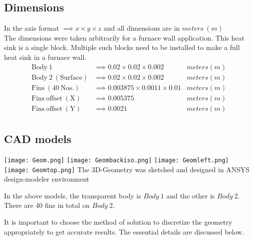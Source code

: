 \documentclass{article}
\begin{document}
\subsection{Dimensions} 
In the axis format $ \implies x \times y \times z$ and all dimensions are in $meters\ (m)$ \\
The dimensions were taken arbitrarily for a furnace wall application. This heat sink is a single block. Multiple such blocks need to be installed to make a full heat sink in a furnace wall. 
\begin{align*}
    \mathrm{Body\ 1} & \implies 0.02 \times 0.02 \times 0.002 & meters (m) \\
    \mathrm{Body\ 2\ (Surface)} & \implies 0.02 \times 0.02 \times 0.002 & meters (m) \\
    \mathrm{Fins\ (40\ Nos.)} & \implies 0.003875 \times 0.0011 \times 0.01 & meters (m) \\
    \mathrm{Fins\ offset\ (X)} & \implies 0.005375 & meters (m) \\
    \mathrm{Fins\ offset\ (Y)} & \implies 0.0021 & meters (m) \\
\end{align*}

\subsection{CAD models}
\begin{center}
    \texttt{[image: Geom.png]}
    \texttt{[image: Geombackiso.png]}
    \texttt{[image: Geomleft.png]}
    \vspace{2cm}
    \texttt{[image: Geomtop.png]}
    \vspace{2cm}
    \scriptsize{The 3D-Geometry was sketched and designed in ANSYS design-modeler environment}
\end{center}
In the above models, the transparent body is $Body\ 1$ and the other is $Body\ 2$. There are 40 fins in total on $Body\ 2$. 

It is important to choose the method of solution to discretize the geometry appropriately to get accurate results. The essential details are discussed below.
\end{document}
